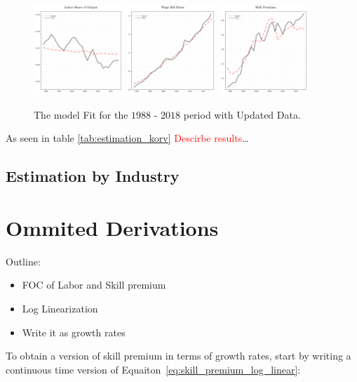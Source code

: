 \documentclass[12pt]{article}
\begin{document}
\begin{figure}[H]
 \centering
 \includegraphics[width=0.3\textwidth]{../images/fig:updated_ind_estimation_ls_doc.pdf}
 \hfill
 \includegraphics[width=0.3\textwidth]{../images/fig:updated_ind_estimation_wbr_doc.pdf}
 \hfill
 \includegraphics[width=0.3\textwidth]{../images/fig:updated_ind_estimation_sp_doc.pdf}
 \caption{\label{fig:korv_estimation_extended_industry} The model Fit for the $1988$ - $2018$ period with Updated Data.}
\end{figure}


As seen in table \ref{tab:estimation_korv} \textcolor{red}{Descirbe results}\dots


\subsection{Estimation by Industry}


\pagebreak{}




\pagebreak{}

\appendix

\section{Ommited Derivations}\label{sec:derivations}
Outline:
\begin{itemize}
 \item FOC of Labor and Skill premium
 \item Log Linearization
 \item Write it as growth rates
\end{itemize}
To obtain a version of skill premium in terms of growth rates, start by writing a continuous time version of Equaiton~\eqref{eq:skill_premium_log_linear}:
\end{document}
